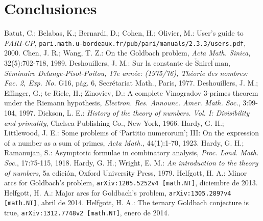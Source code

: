 \documentclass[11pt,a4paper,openright,oneside]{article}
\numberwithin{equation}{section}
\theoremstyle{definition}
\begin{document}

\section{Conclusiones}
\newpage


\begin{thebibliography}{25}
     Batut, C.; Belabas, K.; Bernardi, D.; Cohen, H.; Olivier, M.: User's guide to \textit{PARI-GP},  \newline \texttt{pari.math.u-bordeaux.fr/pub/pari/manuals/2.3.3/users.pdf}, 2000.
     Chen, J. R.; Wang, T. Z.: On the Goldbach problem, \textit{Acta Math. Sinica}, 32(5):702-718, 1989.
     Deshouillers, J. M.: Sur la constante de $\check{\text{S}}\text{nirel}^{\prime} \text{man}$, \textit{S\'eminaire Delange-Pisot-Poitou, 17e ann\'ee: (1975/76), Th\'eorie des nombres: Fac. 2, Exp. No.} G16, p\'ag. 6, Secr\'etariat Math., Paris, 1977.
     Deshouillers, J. M.; Effinger, G.; te Riele, H.; Zinoviev, D.: A complete Vinogradov 3-primes theorem under the Riemann hypothesis, \textit{Electron. Res. Announc. Amer. Math. Soc.}, 3:99-104, 1997.
     Dickson, L. E.: \textit{History of the theory of numbers. Vol. I: Divisibility and primality}, Chelsea Publishing Co., New York, 1966.
     Hardy, G. H.; Littlewood, J. E.: Some problems of \textquoteleft Partitio numerorum\textquoteright; III: On the expression of a number as a sum of primes, \textit{Acta Math.}, 44(1):1-70, 1923.
     Hardy, G. H.; Ramanujan, S.: Asymptotic formulae in combinatory analysis, \textit{Proc. Lond. Math. Soc.}, 17:75-115, 1918.
     Hardy, G. H.; Wright, E. M.: \textit{An introduction to the theory of numbers}, 5a edici\'on, Oxford University Press, 1979.
     Helfgott, H. A.: Minor arcs for Goldbach's problem, \newline \texttt{arXiv:1205.5252v4 [math.NT]}, diciembre de 2013.
     Helfgott, H. A.: Major arcs for Goldbach's problem, \newline \texttt{arXiv:1305.2897v4 [math.NT]}, abril de 2014.
     Helfgott, H. A.: The ternary Goldbach conjecture is true, \newline \texttt{arXiv:1312.7748v2 [math.NT]}, enero de 2014.

\end{thebibliography}
\end{document}
